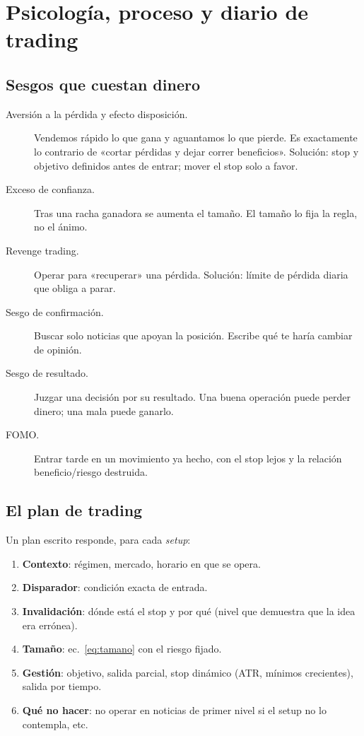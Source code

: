 \chapter{Psicología, proceso y diario de trading}\label{cap:psico}

\section{Sesgos que cuestan dinero}
\begin{description}
\item[Aversión a la pérdida y efecto disposición.] Vendemos rápido lo que gana y aguantamos lo que
  pierde. Es exactamente lo contrario de «cortar pérdidas y dejar correr beneficios». Solución: stop y
  objetivo definidos antes de entrar; mover el stop solo a favor.
\item[Exceso de confianza.] Tras una racha ganadora se aumenta el tamaño. El tamaño lo fija la regla, no el ánimo.
\item[Revenge trading.] Operar para «recuperar» una pérdida. Solución: límite de pérdida diaria que obliga a parar.
\item[Sesgo de confirmación.] Buscar solo noticias que apoyan la posición. Escribe qué te haría cambiar de opinión.
\item[Sesgo de resultado.] Juzgar una decisión por su resultado. Una buena operación puede perder dinero; una mala puede ganarlo.
\item[FOMO.] Entrar tarde en un movimiento ya hecho, con el stop lejos y la relación beneficio/riesgo destruida.
\end{description}

\section{El plan de trading}
Un plan escrito responde, para cada \emph{setup}:
\begin{enumerate}
\item \textbf{Contexto}: régimen, mercado, horario en que se opera.
\item \textbf{Disparador}: condición exacta de entrada.
\item \textbf{Invalidación}: dónde está el stop y por qué (nivel que demuestra que la idea era errónea).
\item \textbf{Tamaño}: ec.~\eqref{eq:tamano} con el riesgo fijado.
\item \textbf{Gestión}: objetivo, salida parcial, stop dinámico (ATR, mínimos crecientes), salida por tiempo.
\item \textbf{Qué no hacer}: no operar en noticias de primer nivel si el setup no lo contempla, etc.
\end{enumerate}

